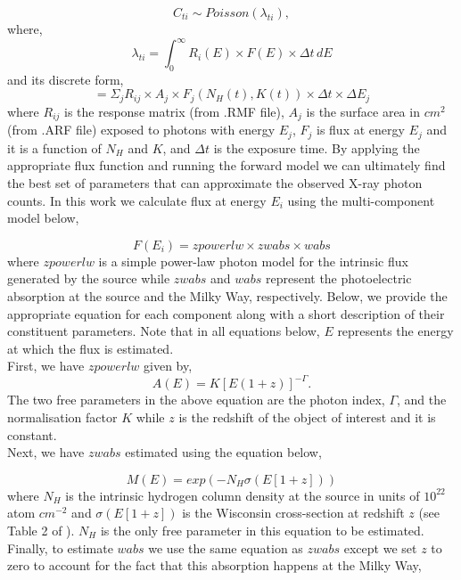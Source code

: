 \documentclass{aa}
\begin{document}
\begin{equation*}
C_{ti} \sim Poisson(\lambda_{ti}),
\label{eq:count_poi}
\end{equation*}
where,
\begin{equation}
\lambda_{ti} = \int_{0}^{\infty} R_i(E) \times F(E) \times \Delta t \,dE 
\label{eq:lambda_con}
\end{equation}
and its discrete form,
\begin{equation}
= \Sigma_{j} R_{ij} \times A_j \times F_j(N_H(t), K(t)) \times \Delta t \times \Delta E_j
\label{eq:lambda_dis}
\end{equation}
where $R_{ij}$ is the response matrix (from .RMF file), $A_j$ is the surface area in $cm^2$ (from .ARF file) exposed to photons with energy $E_j$, $F_j$ is flux at energy $E_j$ and it is a function of $N_H$ and $K$, and $\Delta t$ is the exposure time. By applying the appropriate flux function and running the forward model we can ultimately find the best set of parameters that can approximate the observed X-ray photon counts. In this work we calculate flux at energy $E_i$ using the multi-component model below,

\begin{equation}
F(E_i) = zpowerlw \times zwabs \times wabs
\label{eq:flux}
\end{equation}
where $zpowerlw$ is a simple power-law photon model for the intrinsic flux generated by the source while $zwabs$ and $wabs$ represent the photoelectric absorption at the source and the Milky Way, respectively. Below, we provide the appropriate equation for each component along with a short description of their constituent parameters. Note that in all equations below, $E$ represents the energy at which the flux is estimated. \\
First, we have $zpowerlw$ given by,
\begin{equation}
A(E) = K[E(1 + z)]^{-\Gamma}.
\label{eq:zpowerlaw}
\end{equation}
The two free parameters in the above equation are the photon index, $\Gamma$, and the normalisation factor $K$ while $z$ is the redshift of the object of interest and it is constant. \\
Next, we have $zwabs$ estimated using the equation below,

\begin{equation}
M(E) = exp(-N_H\sigma(E[1 + z]))
\label{eq:zwabs}
\end{equation}
where $N_H$ is the intrinsic hydrogen column density at the source in units of $10^{22}$ atom $cm^{-2}$ and $\sigma(E[1 + z])$ is the Wisconsin cross-section at redshift $z$ (see Table 2 of \citealt{Morrison1983}). $N_H$ is the only free parameter in this equation to be estimated. \\
Finally, to estimate $wabs$ we use the same equation as $zwabs$ except we set $z$ to zero to account for the fact that this absorption happens at the Milky Way, 
\end{document}
